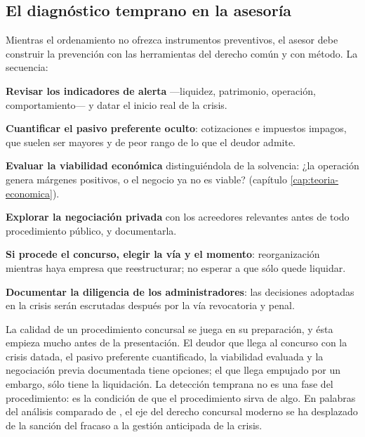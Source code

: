 \subsection{El diagnóstico temprano en la asesoría}

Mientras el ordenamiento no ofrezca instrumentos preventivos, el asesor debe construir la prevención
con las herramientas del derecho común y con método. La secuencia:

\begin{checklist}
  \item \textbf{Revisar los indicadores de alerta} ---liquidez, patrimonio, operación,
  comportamiento--- y datar el inicio real de la crisis.
  \item \textbf{Cuantificar el pasivo preferente oculto}: cotizaciones e impuestos impagos, que
  suelen ser mayores y de peor rango de lo que el deudor admite.
  \item \textbf{Evaluar la viabilidad económica} distinguiéndola de la solvencia: ¿la operación
  genera márgenes positivos, o el negocio ya no es viable? (capítulo \ref{cap:teoria-economica}).
  \item \textbf{Explorar la negociación privada} con los acreedores relevantes antes de todo
  procedimiento público, y documentarla.
  \item \textbf{Si procede el concurso, elegir la vía y el momento}: reorganización mientras haya
  empresa que reestructurar; no esperar a que sólo quede liquidar.
  \item \textbf{Documentar la diligencia de los administradores}: las decisiones adoptadas en la
  crisis serán escrutadas después por la vía revocatoria y penal.
\end{checklist}

\begin{foco}
La calidad de un procedimiento concursal se juega en su preparación, y ésta empieza mucho antes de
la presentación. El deudor que llega al concurso con la crisis datada, el pasivo preferente
cuantificado, la viabilidad evaluada y la negociación previa documentada tiene opciones; el que llega
empujado por un embargo, sólo tiene la liquidación. La detección temprana no es una fase del
procedimiento: es la condición de que el procedimiento sirva de algo. En palabras del análisis
comparado de \textcite{ruz-derecho-concursal}, el eje del derecho concursal moderno se ha desplazado
de la sanción del fracaso a la gestión anticipada de la crisis.
\end{foco}
